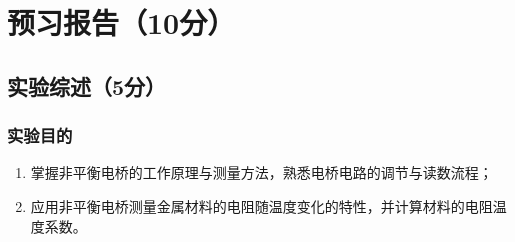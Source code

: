 \documentclass[]{../../templates/Report}%
\begin{document}
\maketitle%

\section{预习报告（10分）}
\subsection{实验综述（5分）}

\subsubsection{实验目的}
\begin{enumerate}
	\item 掌握非平衡电桥的工作原理与测量方法，熟悉电桥电路的调节与读数流程；
	\item 应用非平衡电桥测量金属材料的电阻随温度变化的特性，并计算材料的电阻温度系数。
\end{enumerate}
\end{document}

